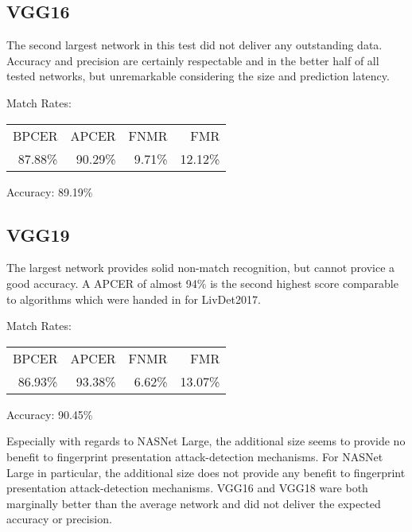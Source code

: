 \subsection{VGG16}
\begin{minipage}[c]{0.7\textwidth}
    The second largest network in this test did not deliver any outstanding data.
    Accuracy and precision are certainly respectable and in the better half of all tested networks, but unremarkable considering the size and prediction latency.

    \medskip\centering Match Rates: 
    \begin{tabular}{ r  r  r  r |}
        BPCER       & APCER      & FNMR     & FMR     \\
        87.88\%   & 90.29\%   & 9.71\%   & 12.12\%  \\
    \end{tabular} \hspace{2mm} Accuracy: 89.19\%
\end{minipage}
\hfill
\begin{minipage}[c]{0.3\textwidth}
    \centering
    
\end{minipage}



\subsection{VGG19}
\begin{minipage}[c]{0.7\textwidth}
    The largest network provides solid non-match recognition, but cannot provice a good accuracy.
    A APCER of almost 94\% is the second highest score comparable to algorithms which were handed in for LivDet2017.

    \medskip\centering Match Rates: 
    \begin{tabular}{ r  r  r  r |}
        BPCER       & APCER      & FNMR     & FMR     \\
        86.93\%   & 93.38\%   & 6.62\%   & 13.07\%  \\
    \end{tabular} \hspace{2mm} Accuracy: 90.45\%
\end{minipage}
\hfill
\begin{minipage}[c]{0.3\textwidth}
    \centering
    
\end{minipage}


Especially with regards to NASNet Large, the additional size seems to provide no benefit to fingerprint presentation attack-detection mechanisms.
For NASNet Large in particular, the additional size does not provide any benefit to fingerprint presentation attack-detection mechanisms.
VGG16 and VGG18 ware both marginally better than the average network and did not deliver the expected accuracy or precision.
